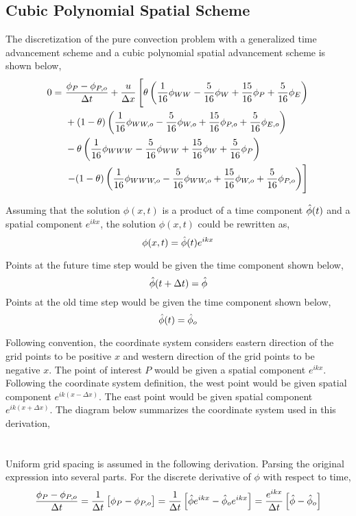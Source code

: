 \documentclass[a4paper, 12pt]{report}
\def\sized{0.14}
\begin{document}
\begin{center}
\subsection{Cubic Polynomial Spatial Scheme}
\begin{comment}
\end{comment}

The discretization of the pure convection problem with a generalized time advancement scheme and a cubic polynomial spatial advancement scheme is shown below,
\begin{equation*}
\begin{split}
0 =\,\, &\frac{\phi_{P} - \phi_{P,o}}{\Delta t} + \frac{u}{\Delta x}\left[ \theta\left(\frac{1}{16}\phi_{WW} - \frac{5}{16}\phi_{W} + \frac{15}{16}\phi_{P} + \frac{5}{16}\phi_{E}\right) \right.
\\ & + (1-\theta)\left( \frac{1}{16}\phi_{WW,o} - \frac{5}{16}\phi_{W,o} + \frac{15}{16}\phi_{P,o} + \frac{5}{16}\phi_{E,o}\right)
\\ & -\theta \left( \frac{1}{16}\phi_{WWW} - \frac{5}{16}\phi_{WW} + \frac{15}{16}\phi_{W} + \frac{5}{16}\phi_{P}\right)
\\ & \left. - (1-\theta)\left( \frac{1}{16}\phi_{WWW,o} - \frac{5}{16}\phi_{WW,o} + \frac{15}{16}\phi_{W,o} + \frac{5}{16}\phi_{P,o}\right)\right]
\end{split}
\end{equation*}


Assuming that the solution $\phi(x,t)$ is a product of a time component $\hat{\phi}(t)$ and a spatial component $e^{ikx}$, the solution $\phi(x,t)$ could be rewritten as,
$$\phi(x,t) = \hat{\phi}(t)e^{ikx}$$


Points at the future time step would be given the time component shown below,
$$\hat{\phi}(t+\Delta t) = \hat{\phi}$$
Points at the old time step would be given the time component shown below,
$$\hat{\phi}(t) = \hat{\phi}_o$$

Following convention, the coordinate system considers eastern direction of the grid points to be positive $x$ and western direction of the grid points to be negative $x$. The point of interest $P$ would be given a spatial component $e^{ikx}$. Following the coordinate system definition, the west point would be given spatial component $e^{ik(x-\Delta x)}$. The east point would be given spatial component $e^{ik(x+\Delta x)}$. The diagram below summarizes the coordinate system used in this derivation,
\\~\\~\\Uniform grid spacing is assumed in the following derivation. Parsing the original expression into several parts. 
For the discrete derivative of $\phi$ with respect to time,
$$\frac{\phi_{P} - \phi_{P,o}}{\Delta t} = \frac{1}{\Delta t}\left[\phi_{P} - \phi_{P,o}\right] = \frac{1}{\Delta t}\left[\hat{\phi}e^{ikx} - \hat{\phi}_oe^{ikx}\right] = \frac{e^{ikx}}{\Delta t}\left[\hat{\phi} - \hat{\phi}_o\right]$$


\end{center}
\end{document}
